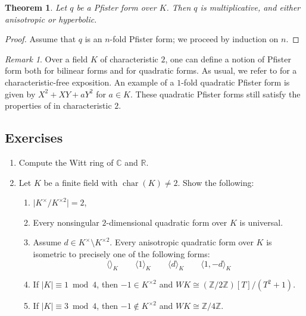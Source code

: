 \documentclass[12pt, leqno, british]{amsart}
\theoremstyle{definition}
\theoremstyle{plain}
\newtheorem{thm}[defi]{Theorem}
\theoremstyle{remark}
\newtheorem{rem}[defi]{Remark}
\newcommand{\mbb}{\mathbb}
\newcommand{\cc}{\mathbb C}
\newcommand{\rr}{\mathbb R}
\newcommand{\zz}{\mbb Z}
\DeclareMathOperator{\charac}{char}
\begin{document}
\begin{thm}\label{T:Pfister-forms}
Let $q$ be a Pfister form over $K$.
Then $q$ is multiplicative, and either anisotropic or hyperbolic.
\end{thm}
\begin{proof}
Assume that $q$ is an $n$-fold Pfister form; we proceed by induction on $n$.
\end{proof}
\begin{rem}
Over a field $K$ of characteristic $2$, one can define a notion of Pfister form both for bilinear forms and for quadratic forms.
As usual, we refer to \autocite[Sections 7, 9]{ElmanKarpenkoMerkurjev} for a characteristic-free exposition.
An example of a $1$-fold quadratic Pfister form is given by $X^2 + XY + aY^2$ for $a \in K$.
These quadratic Pfister forms still satisfy the properties of  in characteristic $2$.
\end{rem}

\subsection{Exercises}
\begin{enumerate}
\item Compute the Witt ring of $\cc$ and $\rr$.
\item Let $K$ be a finite field with $\charac(K) \neq 2$.
Show the following:
\begin{enumerate}
\item $\lvert K^\times / K^{\times 2} \rvert = 2$,
\item Every nonsingular $2$-dimensional quadratic form over $K$ is universal.
\item Assume $d \in K^\times \setminus K^{\times 2}$.
Every anisotropic quadratic form over $K$ is isometric to precisely one of the following forms:
\begin{displaymath}
\langle \rangle_K \qquad \langle 1 \rangle_K \qquad \langle d \rangle_K \qquad \langle 1, -d \rangle_K
\end{displaymath}
\item If $\lvert K \rvert \equiv 1 \bmod 4$, then $-1 \in K^{\times 2}$ and $WK \cong (\zz/2\zz)[T]/(T^2 + 1)$.
\item If $\lvert K \rvert \equiv 3 \bmod 4$, then $-1 \not\in K^{\times 2}$ and $WK \cong \zz/4\zz$.
\end{enumerate}
\end{enumerate}

\printindex
\printbibliography
\end{document}
